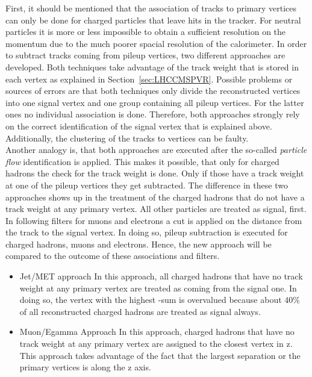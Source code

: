 First, it should be mentioned that the association of tracks to primary vertices can only be done for charged particles that leave hits in the tracker. For neutral particles it is more or less impossible to obtain a sufficient resolution on the momentum due to the much poorer spacial resolution of the calorimeter. In order to subtract tracks coming from pileup vertices, two different approaches are developed. Both techniques take advantage of the track weight that is stored in each vertex as explained in Section~\ref{sec:LHCCMSPVR}. Possible problems or sources of errors are that both techniques only divide the reconstructed vertices into one signal vertex and one group containing all pileup vertices. For the latter ones no individual association is done. Therefore, both approaches strongly rely on the correct identification of the signal vertex that is explained above. Additionally, the clustering of the tracks to vertices can be faulty. \\
Another analogy is, that both approaches are executed after the so-called \textit{particle flow} identification is applied. This makes it possible, that only for charged hadrons  the check for the track weight is done.  Only if those have a track weight at one of the pileup vertices they get subtracted. The difference in these two approaches shows up in the treatment of the charged hadrons that do not have a track weight at any primary vertex. All other particles are treated as signal, first. In following filters for muons and electrons a cut is applied on the distance from the track to the signal vertex. In doing so, pileup subtraction is executed for charged hadrons, muons and electrons. Hence, the new approach will be compared to the outcome of these associations and filters.

\begin{itemize}
    \item{Jet/MET approach} In this approach, all charged hadrons that have no track weight at any primary vertex are treated as coming from the signal one. In doing so, the vertex with the highest \pt-sum is overvalued because about $40\%$ of all reconstructed charged hadrons are treated as signal always.

    \item{Muon/Egamma Approach} In this approach, charged hadrons that have no track weight at any primary vertex are assigned to the closest vertex in z. This approach takes advantage of the fact that the largest separation or the primary vertices is along the z axis.
\end{itemize}

